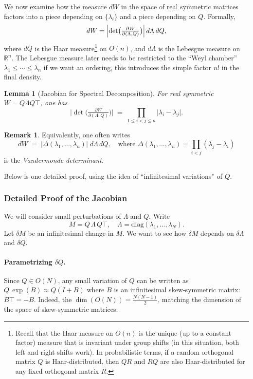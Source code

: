 \documentclass[letterpaper,11pt,oneside,reqno]{article}
\numberwithin{equation}{section}
\newtheorem{lemma}[proposition]{Lemma}
\theoremstyle{definition}
\newtheorem{remark}[proposition]{Remark}
\begin{document}
We now examine how the measure \(dW\) in the space of real symmetric matrices factors into a piece depending on \(\{\lambda_i\}\) and a piece depending on \(Q\).  Formally,
\[
  dW
  = \Bigl|\det\bigl(\tfrac{\partial W}{\partial(\Lambda,Q)}\bigr)\Bigr|
    \,d\Lambda\,dQ,
\]
where \(dQ\) is the Haar measure\footnote{Recall that the
	Haar measure on \(O(n)\) is the unique
	(up to a constant factor) measure that is invariant under
	group shifts (in this situation, both left and right shifts
	work). In probabilistic terms,
	if a random orthogonal matrix $Q$ is Haar-distributed,
	then $QR$ and $RQ$ are also Haar-distributed for any fixed orthogonal
matrix $R$.}
on \(O(n)\), and
\(d\Lambda\) is the Lebesgue measure on \(\mathbb{R}^n\).
The Lebesgue measure later needs to be restricted
to the ``Weyl chamber''
\(\lambda_1\le \cdots\le \lambda_n\) if we want an ordering,
this introduces the simple factor \(n!\) in the final density.


\begin{lemma}[Jacobian for Spectral Decomposition]
\label{thm:Jacobian-GOE}
For real symmetric \(W=Q\Lambda Q\top\), one has
\[
  \bigl|\det\bigl(\tfrac{\partial W}{\partial(\Lambda,Q)}\bigr)\bigr|
  \;=\;
  \prod_{1\le i<j\le n}
  \bigl|\lambda_i - \lambda_j\bigr|.
\]
\end{lemma}

\begin{remark}
Equivalently, one often writes
\[
  dW
  \;=\;
  \bigl|\Delta(\lambda_1,\dots,\lambda_n)\bigr|\;
  d\Lambda\,dQ,
  \quad\text{where }
  \Delta(\lambda_1,\dots,\lambda_n)
  = \prod_{i<j}(\lambda_j-\lambda_i)
\]
is the \emph{Vandermonde determinant}.
\end{remark}

Below is one detailed proof, using the idea of “infinitesimal variations” of \(Q\).

\subsubsection*{Detailed Proof of the Jacobian}

We will consider small perturbations of \(\Lambda\) and \(Q\).  Write
\[
  M = Q\,\Lambda\,Q\top,
  \quad
  \Lambda = \mathrm{diag}(\lambda_1,\dots,\lambda_N).
\]
Let \(\delta M\) be an infinitesimal change in \(M\). We want to see how \(\delta M\) depends on \(\delta\Lambda\) and \(\delta Q\).

\paragraph{Parametrizing \(\delta Q\).}
Since \(Q\in O(N)\), any small variation of \(Q\) can be written as \(Q\,\exp(B)\approx Q(I+B)\) where \(B\) is an infinitesimal skew-symmetric matrix: \(B\top=-B\). Indeed, the \(\dim(O(N)) = \tfrac{N(N-1)}{2}\), matching the dimension of the space of skew-symmetric matrices.
\end{document}
